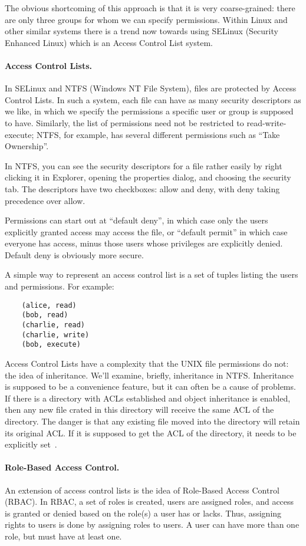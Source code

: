The obvious shortcoming of this approach is that it is very coarse-grained: there are only three groups for whom we can specify permissions. Within Linux and other similar systems there is a trend now towards using SELinux (Security Enhanced Linux) which is an Access Control List system.

\paragraph{Access Control Lists.}
In SELinux and NTFS (Windows NT File System), files are protected by Access Control Lists. In such a system, each file can have as many security descriptors as we like, in which we specify the permissions a specific user or group is supposed to have. Similarly, the list of permissions need not be restricted to read-write-execute; NTFS, for example, has several different permissions such as ``Take Ownership''.

In NTFS, you can see the security descriptors for a file rather easily by right clicking it in Explorer, opening the properties dialog, and choosing the security tab. The descriptors have two checkboxes: allow and deny, with deny taking precedence over allow.

Permissions can start out at ``default deny'', in which case only the users explicitly granted access may access the file, or ``default permit'' in which case everyone has access, minus those users whose privileges are explicitly denied. Default deny is obviously more secure.

A simple way to represent an access control list is a set of tuples listing the users and permissions. For example:
\begin{verbatim}
	(alice, read)
	(bob, read)
	(charlie, read)
	(charlie, write)
	(bob, execute)
\end{verbatim}

Access Control Lists have a complexity that the UNIX file permissions do not: the idea of inheritance. We'll examine, briefly, inheritance in NTFS. Inheritance is supposed to be a convenience feature, but it can often be a cause of problems. If there is a directory with ACLs established and object inheritance is enabled, then any new file crated in this directory will receive the same ACL of the directory. The danger is that any existing file moved into the directory will retain its original ACL. If it is supposed to get the ACL of the directory, it needs to be explicitly set~\cite{ntfsacl}.

\paragraph {Role-Based Access Control.}
An extension of access control lists is the idea of Role-Based Access Control (RBAC). In RBAC, a set of roles is created, users are assigned roles, and access is granted or denied based on the role(s) a user has or lacks. Thus, assigning rights to users is done by assigning roles to users. A user can have more than one role, but must have at least one.


